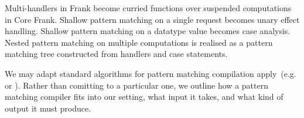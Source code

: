 \documentclass[preprint]{sigplanconf}
\newcommand{\many}{\overline}
\newcommand{\judgeword}[1]{~\mathbf{#1}~}
\newcommand{\sigentails}[1]{\mathbin{[{\text{\scriptsize ${#1}$}}]\!\text{-\!-}}\,}
\newcommand{\rt}[1]{\langle{#1}\rangle}   %
\newcommand{\makes}[4]  {#1 \sigentails{#2} {#3} \judgeword{infers} {#4}}
\newcommand{\has}[4] {#1 \sigentails{#2} {#3} \judgeword{checks} {#4}}
\newcommand{\can}[4]{#1 \sigentails{#2} {#3} \judgeword{infers} {#4}}
\newcommand{\makesgs}{\makes{\Gamma}{\sigs}}
\newcommand{\hasgs}{\has{\Gamma}{\sigs}}
\newcommand{\sigs}{\Sigma}
\newcommand{\effbox}[1]{[#1]}
\newcommand{\key}[1]{\mathsf{#1}}
\newcommand{\handleSymbol}{\mathbin{?}}
\newcommand{\handle}[2]{{#1} \handleSymbol {#2}}
\newcommand{\thunk}[1]{\{{#1}\}}
\begin{document}






Multi-handlers in Frank become curried functions over suspended
computations in Core Frank.
%
Shallow pattern matching on a single request becomes unary effect
handling. Shallow pattern matching on a datatype value becomes case
analysis. Nested pattern matching on multiple computations is realised
as a pattern matching tree constructed from handlers and case
statements. 

We may adapt standard algorithms for pattern matching compilation
apply~(e.g. \cite{Augustsson85} or \cite{Maranget08}). Rather than
comitting to a particular one, we outline how a pattern matching
compiler fits into our setting, what input it takes, and what kind of
output it must produce.
\end{document}
